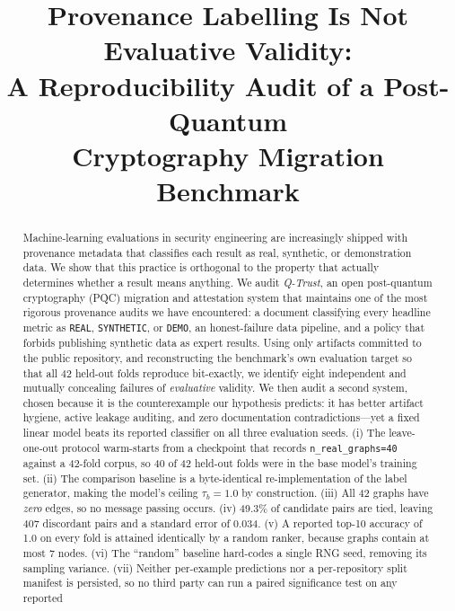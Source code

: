 \documentclass[conference]{IEEEtran}
\newcommand{\code}[1]{\texttt{\small #1}}
\begin{document}
\title{Provenance Labelling Is Not Evaluative Validity:\\
       A Reproducibility Audit of a Post-Quantum\\
       Cryptography Migration Benchmark}
\author{}
\maketitle

\begin{abstract}
\noindent
Machine-learning evaluations in security engineering are increasingly shipped with
provenance metadata that classifies each result as real, synthetic, or demonstration data.
We show that this practice is orthogonal to the property that actually determines whether
a result means anything. We audit \emph{Q-Trust}, an open post-quantum cryptography (PQC)
migration and attestation system that maintains one of the most rigorous provenance
audits we have encountered: a document classifying every headline metric as
\code{REAL}, \code{SYNTHETIC}, or \code{DEMO}, an honest-failure data pipeline, and a
policy that forbids publishing synthetic data as expert results. Using only artifacts
committed to the public repository, and reconstructing the benchmark's own evaluation
target so that all 42 held-out folds reproduce bit-exactly, we identify eight independent
and mutually concealing failures of \emph{evaluative} validity. We then audit a second
system, chosen because it is the counterexample our hypothesis predicts: it has better
artifact hygiene, active leakage auditing, and zero documentation contradictions---yet a
fixed linear model beats its reported classifier on all three evaluation seeds. (i) The leave-one-out
protocol warm-starts from a checkpoint that records
\code{n\_real\_graphs=40} against a 42-fold corpus, so 40 of 42 held-out folds were in
the base model's training set. (ii) The comparison baseline is a byte-identical
re-implementation of the label generator, making the model's ceiling
$\tau_b=1.0$ by construction. (iii) All 42 graphs have \emph{zero} edges, so no message
passing occurs. (iv) 49.3\% of candidate pairs are tied, leaving 407 discordant pairs and
a standard error of 0.034. (v) A reported top-10 accuracy of 1.0 on every fold is
attained identically by a random ranker, because graphs contain at most 7 nodes.
(vi) The ``random'' baseline hard-codes a single RNG seed, removing its sampling
variance. (vii) Neither per-example predictions nor a per-repository split manifest is
persisted, so no third party can run a paired significance test on any reported

\end{abstract}
\end{document}
